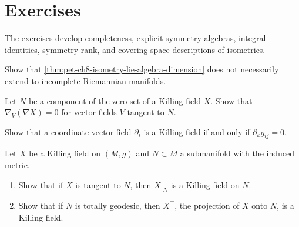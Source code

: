 \section{Exercises}

The exercises develop completeness, explicit symmetry algebras, integral
identities, symmetry rank, and covering-space descriptions of isometries.

\begin{remark}
  \label{rem:pet-ch8-ex-8-4-1}

  Show that \cref{thm:pet-ch8-isometry-lie-algebra-dimension} does not
  necessarily extend to incomplete Riemannian manifolds.
\end{remark}

\begin{remark}
  \label{rem:pet-ch8-ex-8-4-2}

  Let $N$ be a component of the zero set of a Killing field $X$. Show that
  $\nabla_V(\nabla X)=0$ for vector fields $V$ tangent to $N$.
\end{remark}

\begin{remark}
  \label{rem:pet-ch8-ex-8-4-3}

  Show that a coordinate vector field $\partial_i$ is a Killing field if and
  only if $\partial_kg_{ij}=0$.
\end{remark}

\begin{remark}
  \label{rem:pet-ch8-ex-8-4-4}

  Let $X$ be a Killing field on $(M,g)$ and $N\subset M$ a submanifold with the
  induced metric.
  \begin{enumerate}
    \item Show that if $X$ is tangent to $N$, then $X|_N$ is a Killing field
      on $N$.
    \item Show that if $N$ is totally geodesic, then $X^\top$, the projection
      of $X$ onto $N$, is a Killing field.
  \end{enumerate}
\end{remark}

